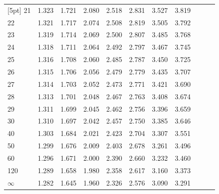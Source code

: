 \begin{frame}
{\begin{tabular}{l|llll>{\columncolor{blue}}llllll}
[5pt]
21 & 1.323 & 1.721 & 2.080 & 2.518 & 2.831 & 3.527 & 3.819 \\ 
22 & 1.321 & 1.717 & 2.074 & 2.508 & 2.819 & 3.505 & 3.792 \\ 
23 & 1.319 & 1.714 & 2.069 & 2.500 & 2.807 & 3.485 & 3.768 \\ 
24 & 1.318 & 1.711 & 2.064 & 2.492 & 2.797 & 3.467 & 3.745 \\ 
25 & 1.316 & 1.708 & 2.060 & 2.485 & 2.787 & 3.450 & 3.725 \\ 
[5pt]
26 & 1.315 & 1.706 & 2.056 & 2.479 & 2.779 & 3.435 & 3.707 \\ 
27 & 1.314 & 1.703 & 2.052 & 2.473 & 2.771 & 3.421 & 3.690 \\ 
28 & 1.313 & 1.701 & 2.048 & 2.467 & 2.763 & 3.408 & 3.674 \\ 
29 & 1.311 & 1.699 & 2.045 & 2.462 & 2.756 & 3.396 & 3.659 \\ 
30 & 1.310 & 1.697 & 2.042 & 2.457 & 2.750 & 3.385 & 3.646 \\ 
[5pt]
40 & 1.303 & 1.684 & 2.021 & 2.423 & 2.704 & 3.307 & 3.551 \\ 
50 & 1.299 & 1.676 & 2.009 & 2.403 & 2.678 & 3.261 & 3.496 \\ 
60 & 1.296 & 1.671 & 2.000 & 2.390 & 2.660 & 3.232 & 3.460 \\ 
120 & 1.289 & 1.658 & 1.980 & 2.358 & 2.617 & 3.160 & 3.373 \\ 
$\infty$ & 1.282 & 1.645 & 1.960 & 2.326 & 2.576 & 3.090 & 3.291 
\end{tabular}


}

\end{frame}



